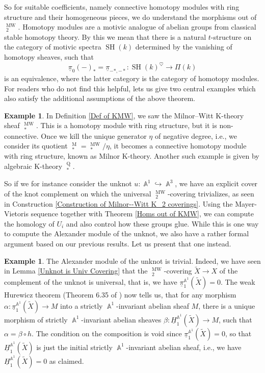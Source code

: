 \documentclass[english]{amsart}
\theoremstyle{definition}
\newtheorem{ex}[prop]{Example}
\DeclareMathOperator{\A}{\mathbb{A}}
\DeclareMathOperator{\SH}{SH}
\DeclareMathOperator{\KK}{\underline{K}}
\DeclareMathOperator{\MM}{M}
\DeclareMathOperator{\QQ}{Q}
\DeclareMathOperator{\MW}{MW}
\begin{document}
So for suitable coefficients, namely connective homotopy modules with ring structure and their homogeneous pieces, we do understand the morphisms out of $\KK^{\MW}_2$. Homotopy modules are a motivic analogue of abelian groups from classical stable homotopy theory. By this we mean that there is a natural $t$-structure on the category of motivic spectra $\SH(k)$ determined by the vanishing of homotopy sheaves, such that 
$$\underline{\pi}_0(-)_* = \underline{\pi}_{-*,-*} \colon \SH(k)^{\heartsuit} \rightarrow \Pi(k)$$
is an equivalence, where the latter category is the category of homotopy modules. For readers who do not find this helpful, lets us give two central examples which also satisfy the additional assumptions of the above theorem.
\begin{ex}
In Definition \ref{Def of KMW}, we saw the Milnor--Witt K-theory sheaf $\KK^{\MW}_*$. This is a homotopy module with ring structure, but it is non-connective. Once we kill the unique generator $\eta$ of negative degree, i.e., we consider its quotient $\KK^{\MM}_* = \KK^{\MW}_* \! \! / \eta$, it becomes a connective homotopy module with ring structure, known as Milnor K-theory. Another such example is given by algebraic K-theory $\KK^{\QQ}_*$.
\end{ex}
So if we for instance consider the unknot $u \colon \A^1 \hookrightarrow \A^3$, we have an explicit cover of the knot complement on which the universal $\KK^{\MW}_2$-covering trivializes, as seen in Construction \ref{Construction of Milnor--Witt K_2 coverings}. Using the Mayer-Vietoris sequence together with Theorem \ref{Homs out of KMW}, we can compute the homology of $U_i$ and also control how these groups glue. While this is one way to compute the Alexander module of the unknot, we also have a rather formal argument based on our previous results. Let us present that one instead.
\begin{ex}\label{Alexander mod of unknot}
The Alexander module of the unknot is trivial. Indeed, we have seen in Lemma \ref{Unknot is Univ Covering} that the $\KK^{\MW}_2$-covering $\widetilde{X} \rightarrow X$ of the complement of the unknot is universal, that is, we have $\underline{\pi}_1^{\A^1}\!(\widetilde{X}) = 0$. The weak Hurewicz theorem (Theorem 6.35 of \cite{MR2934577}) now tells us, that for any morphism $\alpha \colon \underline{\pi}_1^{\A^1}\!(\widetilde{X}) \rightarrow M$ into a strictly $\A^1$-invariant abelian sheaf $M$, there is a unique morphism of strictly $\A^1$-invariant abelian sheaves $\beta \colon \underline{H}_1^{\A^1}\!(\widetilde{X}) \rightarrow M$, such that $\alpha = \beta \circ h$. The condition on the composition is void since $\underline{\pi}_1^{\A^1}\!(\widetilde{X}) = 0$, so that $\underline{H}_1^{\A^1}\!(\widetilde{X})$ is just the initial strictly $\A^1$-invariant abelian sheaf, i.e., we have $\underline{H}_1^{\A^1}\!(\widetilde{X}) = 0$ as claimed.
\end{ex}
\end{document}
